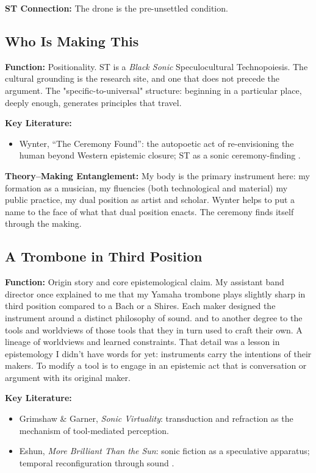 \noindent\textbf{ST Connection:} The drone is the pre-unsettled condition.

\bigskip

\subsection*{Who Is Making This}

\noindent\textbf{Function:} Positionality. ST is a \textit{Black Sonic} Speculocultural Technopoiesis. The cultural grounding is the research site, and one that does not precede the argument. The "specific-to-universal" structure: beginning in a particular place, deeply enough, generates principles that travel.

\noindent\textbf{Key Literature:}
\begin{itemize}[noitemsep]
    \item Wynter, ``The Ceremony Found'': the autopoetic act of re-envisioning the human beyond Western epistemic closure; ST as a sonic ceremony-finding \parencite{Wynter_2015}.
\end{itemize}

\noindent\textbf{Theory--Making Entanglement:} My body is the primary instrument here: my formation as a musician, my fluencies (both technological and material) my public practice, my dual position as artist and scholar. Wynter helps to put a name to the face of what that dual position enacts. The ceremony finds itself through the making.

\bigskip

\subsection*{A Trombone in Third Position}

\noindent\textbf{Function:} Origin story and core epistemological claim. My assistant band director once explained to me that my Yamaha trombone plays slightly sharp in third position compared to a Bach or a Shires. Each maker designed the instrument around a distinct philosophy of sound. and to another degree to the tools and worldviews of those tools that they in turn used to craft their own. A lineage of worldviews and learned constraints. That detail was a lesson in epistemology I didn't have words for yet: instruments carry the intentions of their makers. To modify a tool is to engage in an epistemic act that is conversation or argument with its original maker.

\noindent\textbf{Key Literature:}
\begin{itemize}[noitemsep]
    \item Grimshaw \& Garner, \textit{Sonic Virtuality}: transduction and refraction as the mechanism of tool-mediated perception.
    \item Eshun, \textit{More Brilliant Than the Sun}: sonic fiction as a speculative apparatus; temporal reconfiguration through sound \parencite{Eshun_1999}.
\end{itemize}

